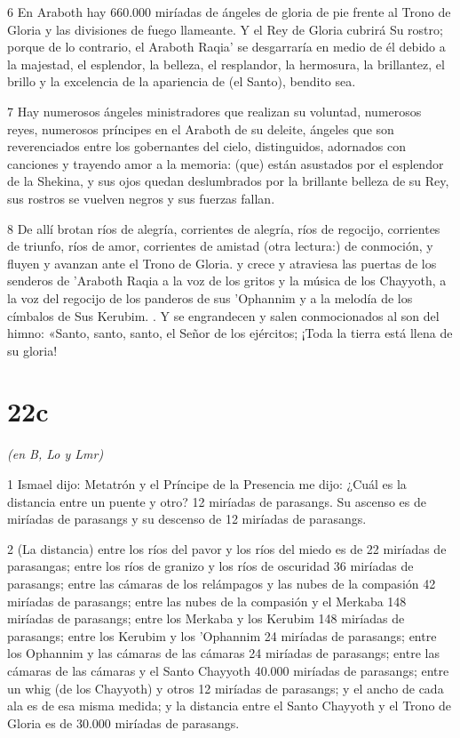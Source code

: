 \par 6 En Araboth hay 660.000 miríadas de ángeles de gloria de pie frente al Trono de Gloria y las divisiones de fuego llameante. Y el Rey de Gloria cubrirá Su rostro; porque de lo contrario, el Araboth Raqia' se desgarraría en medio de él debido a la majestad, el esplendor, la belleza, el resplandor, la hermosura, la brillantez, el brillo y la excelencia de la apariencia de (el Santo), bendito sea.

\par 7 Hay numerosos ángeles ministradores que realizan su voluntad, numerosos reyes, numerosos príncipes en el Araboth de su deleite, ángeles que son reverenciados entre los gobernantes del cielo, distinguidos, adornados con canciones y trayendo amor a la memoria: (que) están asustados por el esplendor de la Shekina, y sus ojos quedan deslumbrados por la brillante belleza de su Rey, sus rostros se vuelven negros y sus fuerzas fallan.

\par 8 De allí brotan ríos de alegría, corrientes de alegría, ríos de regocijo, corrientes de triunfo, ríos de amor, corrientes de amistad (otra lectura:) de conmoción, y fluyen y avanzan ante el Trono de Gloria. y crece y atraviesa las puertas de los senderos de 'Araboth Raqia a la voz de los gritos y la música de los Chayyoth, a la voz del regocijo de los panderos de sus 'Ophannim y a la melodía de los címbalos de Sus Kerubim. . Y se engrandecen y salen conmocionados al son del himno: «Santo, santo, santo, el Señor de los ejércitos; ¡Toda la tierra está llena de su gloria!

\chapter{22c}

\par \textit{(en B, Lo y Lmr)}

\par 1 Ismael dijo: Metatrón y el Príncipe de la Presencia me dijo: ¿Cuál es la distancia entre un puente y otro? 12 miríadas de parasangs. Su ascenso es de miríadas de parasangs y su descenso de 12 miríadas de parasangs.

\par 2 (La distancia) entre los ríos del pavor y los ríos del miedo es de 22 miríadas de parasangas; entre los ríos de granizo y los ríos de oscuridad 36 miríadas de parasangs; entre las cámaras de los relámpagos y las nubes de la compasión 42 miríadas de parasangs; entre las nubes de la compasión y el Merkaba 148 miríadas de parasangs; entre los Merkaba y los Kerubim 148 miríadas de parasangs; entre los Kerubim y los 'Ophannim 24 miríadas de parasangs; entre los Ophannim y las cámaras de las cámaras 24 miríadas de parasangs; entre las cámaras de las cámaras y el Santo Chayyoth 40.000 miríadas de parasangs; entre un whig (de los Chayyoth) y otros 12 miríadas de parasangs; y el ancho de cada ala es de esa misma medida; y la distancia entre el Santo Chayyoth y el Trono de Gloria es de 30.000 miríadas de parasangs.

